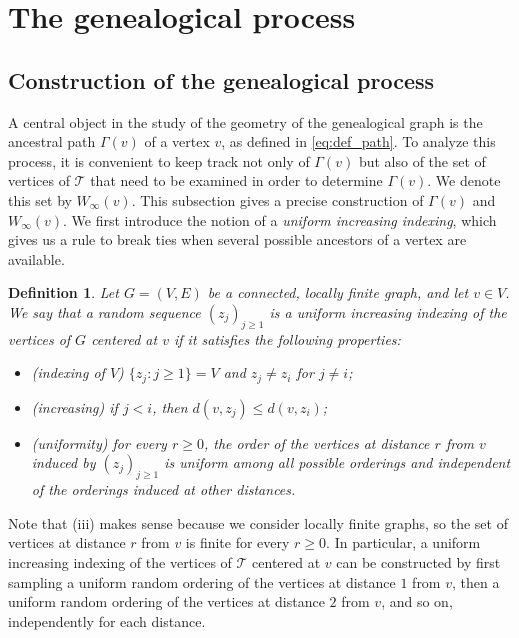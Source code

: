 \documentclass[french]{article}
\newcommand{\zi}{z}
\newtheorem{defi}[theorem]{Definition}
\newcommand{\T}{\mathcal{T}}
\renewcommand{\1}{\mathds{1}}
\begin{document}
\newpage



\section{The genealogical process}\label{s:genealogicalprocess}

\subsection{Construction of the genealogical process}\label{sec:constructionW}
A central object in the study of the geometry of the genealogical graph is the ancestral path $\Gamma(v)$ of a vertex $v$, as defined in \eqref{eq:def_path}. To analyze this process, it is convenient to keep track not only of $\Gamma(v)$ but also of the set of vertices of $\T$ that need to be examined in order to determine $\Gamma(v)$. We denote this set by $W_\infty(v)$. This subsection gives a precise construction of $\Gamma(v)$ and $W_\infty(v)$. We first introduce the notion of a \emph{uniform increasing indexing}, which gives us a rule to break ties when several possible ancestors of a vertex are available.

\begin{defi}\label{def:randomindex}
Let $G=(V,E)$ be a connected, locally finite graph, and let $v \in V$.
We say that a random sequence $(\zi_j)_{j \ge 1}$ is a uniform increasing indexing of the vertices of $G$ centered at $v$ if it satisfies the following properties:
\begin{itemize}
    \item[(i)] (indexing of $V$) $\{\zi_j : j \ge 1\} = V$ and $\zi_j \neq \zi_i$ for $j \neq i$;
    \item[(ii)] (increasing) if $j < i$, then $d(v,\zi_j) \le d(v,\zi_i)$;
    \item[(iii)] (uniformity) for every $r \ge 0$, the order of the vertices at distance $r$ from $v$ induced by $(\zi_j)_{j \ge 1}$ is uniform among all possible orderings and independent of the orderings induced at other distances.
\end{itemize}
\end{defi} 
Note that (iii) makes sense because we consider locally finite graphs, so the set of vertices at distance $r$ from $v$ is finite for every $r \ge 0$. In particular, a uniform increasing indexing of the vertices of $\T$ centered at $v$ can be constructed by first sampling a uniform random ordering of the vertices at distance $1$ from $v$, then a uniform random ordering of the vertices at distance $2$ from $v$, and so on, independently for each distance.
\end{document}
